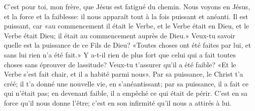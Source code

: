 C’est pour toi, mon frère, que Jésus est fatigué du chemin.
Nous voyons en Jésus, et la force et la faiblesse:
	il nous apparaît tout à la fois puissant et anéanti.
Il est puissant, car «au commencement il était le Verbe,
	et le Verbe était en Dieu, et le Verbe était Dieu;
	il était au commencement auprès de Dieu.»
Veux-tu savoir quelle est la puissance de ce Fils de Dieu?
«Toutes choses ont été faites par lui, et sans lui rien n’a été fait.»
Y a-t-il rien de plus fort
	que celui qui a fait toutes choses sans éprouver de lassitude?
Veux-tu t’assurer qu’il a été faible?
«Et le Verbe s’est fait chair, et il a habité parmi nous».
Par sa puissance, le Christ t’a créé;
	il t’a donné une nouvelle vie, en s’anéantissant;
	par sa puissance, il a fait ce qui n’était pas;
	en devenant faible, il a empêché ce qui était de périr.
C’est en sa force qu’il nous donne l’être;
	c’est en son infirmité qu’il nous a attirés à lui.
